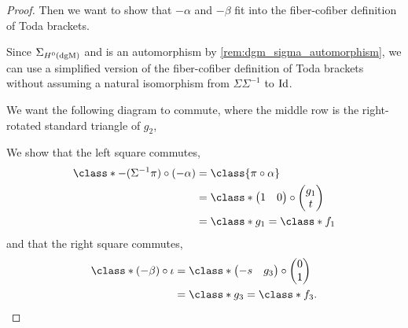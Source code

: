 \begin{proof}
    Then we want to show that \( -\alpha \) and \( -\beta \) fit into the fiber-cofiber definition of Toda brackets.

    Since \( \Sigma_{H^0(\operatorname{dgM})} \) and is an automorphism by \autoref{rem:dgm_sigma_automorphism}, we can use a simplified version of the fiber-cofiber definition of Toda brackets without assuming a natural isomorphism from \( \Sigma \Sigma^{-1} \) to \( \operatorname{Id} \).

    We want the following diagram to commute, where the middle row is the right-rotated standard triangle of \( g_2 \),
    \begin{center}
    \end{center}

    We show that the left square commutes,
    \begin{align*}
        \class*{- (\Sigma^{-1} \pi) \circ (- \alpha)} &= \class{\pi \circ \alpha} \\
        &=
        \class*{
            \begin{pmatrix}
                1 & 0
            \end{pmatrix}
            \circ
            \begin{pmatrix}
                g_1 \\
                t
            \end{pmatrix} 
        } \\
        &= \class*{g_1} = \class*{f_1}
    \end{align*}
    and that the right square commutes,
    \begin{align*}
        \class*{(- \beta) \circ \iota} &=
        \class*{
            \begin{pmatrix}
                - s & g_3
            \end{pmatrix}
            \circ
            \begin{pmatrix}
                0 \\
                1
            \end{pmatrix}
         } \\
        &= \class*{g_3} = \class*{f_3}.
    \end{align*}


\end{proof}
